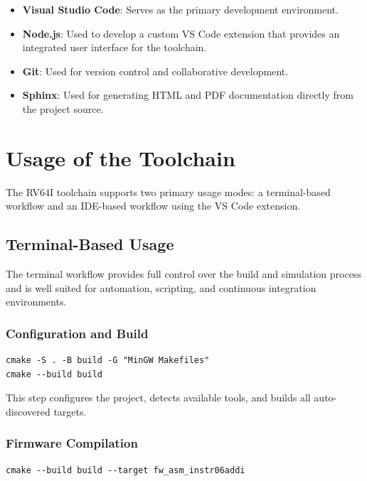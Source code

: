 \begin{itemize}
    \item \textbf{Visual Studio Code}:  
    Serves as the primary development environment.
    
    \item \textbf{Node.js}:  
    Used to develop a custom VS Code extension that provides an integrated user interface for the toolchain.
    
    \item \textbf{Git}:  
    Used for version control and collaborative development.
    
    \item \textbf{Sphinx}:  
    Used for generating HTML and PDF documentation directly from the project source.
\end{itemize}

\section{Usage of the Toolchain}

The RV64I toolchain supports two primary usage modes: a terminal-based workflow and an IDE-based workflow using the VS Code extension.

\subsection{Terminal-Based Usage}

The terminal workflow provides full control over the build and simulation process and is well suited for automation, scripting, and continuous integration environments.

\subsubsection{Configuration and Build}

\begin{verbatim}
cmake -S . -B build -G "MinGW Makefiles"
cmake --build build
\end{verbatim}

This step configures the project, detects available tools, and builds all auto-discovered targets.

\subsubsection{Firmware Compilation}

\begin{verbatim}
cmake --build build --target fw_asm_instr06addi
\end{verbatim}

